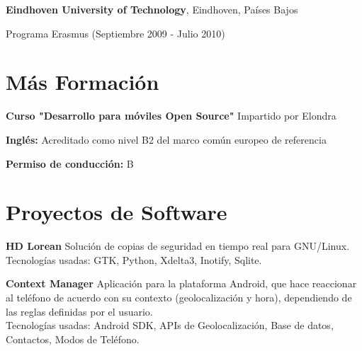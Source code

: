 \documentclass[margin,line]{resume}
\begin{document}
\begin{resume}
{\bf Eindhoven University of Technology}, Eindhoven, Países Bajos\\
\vspace*{-.1in}
\begin{list1}
\item[] Programa Erasmus (Septiembre 2009 - Julio 2010)
\end{list1}

\section{\sc Más Formación } 
\begin{list1}
\item[] {\bf Curso "Desarrollo para móviles Open Source"} Impartido por Elondra
\item[] {\bf Inglés:} Acreditado como nivel B2 del marco común europeo de referencia
\item[] {\bf Permiso de conducción:} B
\end{list1}

\section{\sc Proyectos de Software } 
\begin{list1}
\item[] {\bf HD Lorean}
Solución de copias de seguridad en tiempo real para GNU/Linux.\\
Tecnologías usadas: GTK, Python, Xdelta3, Inotify, Sqlite.\\

\item[] {\bf Context Manager}
Aplicación para la plataforma Android, que hace reaccionar al teléfono 
de acuerdo con su contexto (geolocalización y hora), dependiendo de las reglas definidas por el usuario.\\
Tecnologías usadas: Android SDK, APIs de Geolocalización, Base de datos,
Contactos, Modos de Teléfono.
\end{list1}


\end{resume}
\end{document}
